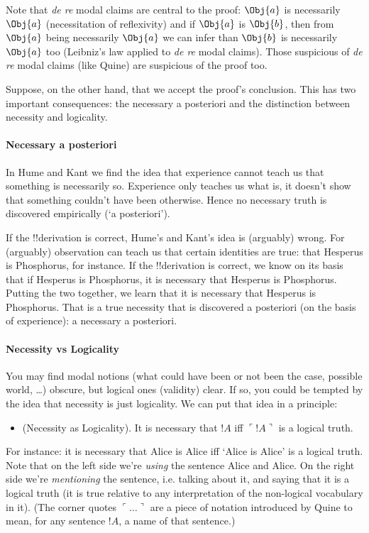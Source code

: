 \documentclass[../../../include/open-logic-section]{subfiles}
\begin{document}
Note that \emph{de re} modal claims are central to the proof: $\Obj{a}$ is
necessarily $\Obj{a}$ (necessitation of reflexivity) and if $\Obj{a}$ is $\Obj{b}$, then
from $\Obj{a}$ being necessarily $\Obj{a}$ we can infer than $\Obj{b}$ is necessarily
$\Obj{a}$ too (Leibniz's law applied to \emph{de re} modal claims). Those
suspicious of \emph{de re} modal claims (like Quine) are suspicious of
the proof too.

Suppose, on the other hand, that we accept the proof's conclusion. 
This has two important consequences: the necessary a posteriori 
and the distinction between necessity and logicality. 

\paragraph{Necessary a posteriori}
 In Hume and Kant we find the idea that 
experience cannot teach us that something is necessarily so. Experience
only teaches us what is, it doesn't show that something couldn't have 
been otherwise. Hence no necessary truth is discovered empirically
(`a posteriori').

If the !!{derivation} is correct, Hume's and Kant's idea is (arguably) 
wrong. For (arguably) observation can teach us that certain identities
are true: that Hesperus is Phosphorus, for instance. If the !!{derivation}
is correct, we know on its basis that if Hesperus is Phosphorus, it is 
necessary that Hesperus is Phosphorus. Putting the two together, we 
learn that  it is necessary that Hesperus is Phosphorus. That is a 
true necessity that is discovered a posteriori (on the basis of 
experience): a necessary a posteriori. 

\paragraph{Necessity vs Logicality} You may find modal notions (what could have 
been or not been the case, possible world, \dots) obscure, but logical
ones (validity) clear. If so, you could be tempted by the idea that 
necessity is just logicality. We can put that idea in a principle:

\begin{itemize}
\item (Necessity as Logicality). It is necessary that $!A$ iff
$\ulcorner!A\urcorner$ is a logical truth.
\end{itemize}

For instance: it is necessary that Alice is Alice iff `Alice is Alice'
is a logical truth. Note that on the left side we're \emph{using} the
sentence Alice and Alice. On the right side we're \emph{mentioning}
the sentence, i.e. talking about it, and saying that it is a logical
truth (it is true relative to any interpretation of the non-logical
vocabulary in it). (The corner quotes $\ulcorner\ldots\urcorner$ are a piece of notation 
introduced by Quine to mean, for any sentence $!A$, a name of that 
sentence.)
\end{document}
